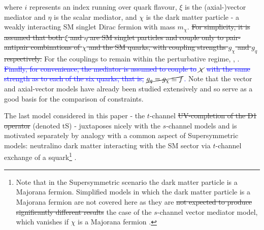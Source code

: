 \begin{flushleft}
where $i$ represents an index running over quark flavour, $\xi$ is the (axial-)vector mediator and $\eta$ is the scalar mediator, and $\chi$ is the dark matter particle - a weakly interacting SM singlet Dirac fermion with mass $m_{\chi}$.   \st{For simplicity, it is assumed that both $\xi$ and $\eta$ are SM singlet particles and couple only to pair-antipair combinations of $\chi$ and the SM quarks, with coupling strengths $g_{\chi}$ and $g_q$ respectively.} For the couplings  to remain within the perturbative regime, ,  \cite{ValidEFT}. \textcolor{blue}{\st{Finally, for convenience, the mediator is assumed to couple to }$\cancel{\chi}$\st{ with the same strength as to each of the six quarks, that is, }$\cancel{g_{q} = g_{\chi} \equiv f}$.}  Note that the vector and axial-vector models have already been studied extensively \cite{Buchmueller:2014yoa, Chatrchyan:2013qha, Aad:2012hf, Harris:2014hga} and so serve as a good basis for the comparison of constraints. 

\hspace{1cm}The last model considered in this paper -  the $t$-channel \st{UV-completion of the D1 operator} (denoted tS) - juxtaposes nicely with the $s$-channel models and is motivated separately by analogy with a common aspect of Supersymmetric models: neutralino dark matter interacting with the SM sector via $t$-channel exchange of a squark\footnote{Note that in the Supersymmetric scenario the dark matter particle is a Majorana fermion. Simplified models in which the dark matter particle is a Majorana fermion are not covered here as they are \st{not expected to produce significantly different results}  the case of the $s$-channel vector mediator model, which vanishes if $\chi$ is a Majorana fermion \cite{METSig}.} \cite{SUSYDM}. 


\end{flushleft}
